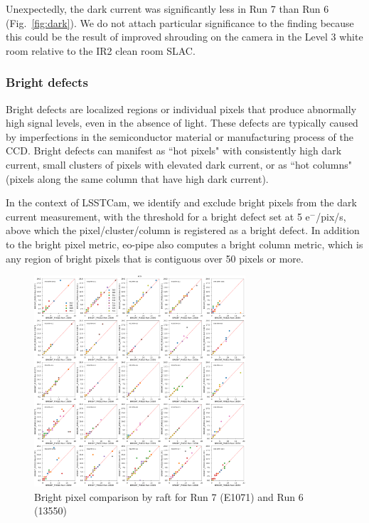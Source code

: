 Unexpectedly, the dark current was significantly less in Run 7 than
Run 6 (Fig.~\ref{fig:dark}). We do not attach particular significance to the finding because this could be the result of improved shrouding on the camera in the Level 3 white room relative to the IR2 clean room SLAC.

\subsubsection{Bright defects}\label{bright-defects}

Bright defects are localized regions or individual pixels that produce abnormally high signal levels, even in the absence of light. These defects are typically caused by imperfections in the semiconductor material or manufacturing process of the CCD. Bright defects can manifest as ``hot pixels" with consistently high dark current, small clusters of pixels with elevated dark current, or as ``hot columns" (pixels along the same column that have high dark current). 

In the context of LSSTCam, we identify and exclude bright pixels from the dark current measurement, with the threshold for a bright defect set at 5 e$^-$/pix/s, above which the pixel/cluster/column is registered as a bright defect. In addition to the bright pixel metric, eo-pipe also computes a bright column metric, which is any region of bright pixels that is contiguous over 50 pixels or more.

\begin{figure}[ht]
\begin{centering}
\includegraphics[width=0.7\textwidth]{figures/baselineCharacterization/13550_E1071_BRIGHT_PIXELS_inset.png}
\caption{Bright pixel comparison by raft for Run 7 (E1071) and Run 6 (13550)}
\label{fig:bright}
\end{centering}
\end{figure}

